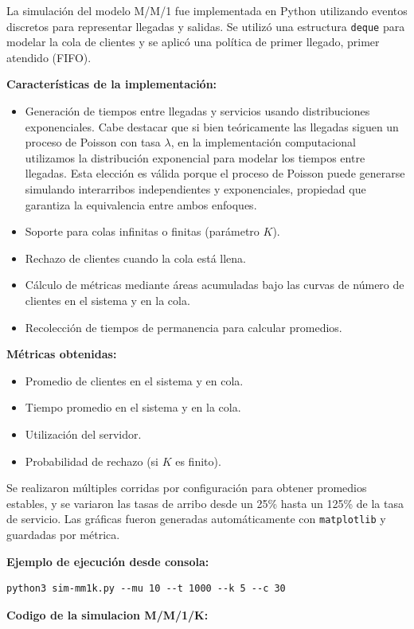 \documentclass[12pt]{article}
\begin{document}
La simulación del modelo M/M/1 fue implementada en Python utilizando eventos discretos para representar llegadas y salidas. Se utilizó una estructura \texttt{deque} para modelar la cola de clientes y se aplicó una política de primer llegado, primer atendido (FIFO).

\textbf{Características de la implementación:}
\begin{itemize}
    \item Generación de tiempos entre llegadas y servicios usando distribuciones exponenciales. Cabe destacar que si bien teóricamente las llegadas siguen un proceso de Poisson con tasa $\lambda$, en la implementación computacional utilizamos la distribución exponencial para modelar los tiempos entre llegadas. Esta elección es válida porque el proceso de Poisson puede generarse simulando interarribos independientes y exponenciales, propiedad que garantiza la equivalencia entre ambos enfoques.
    \item Soporte para colas infinitas o finitas (parámetro $K$).
    \item Rechazo de clientes cuando la cola está llena.
    \item Cálculo de métricas mediante áreas acumuladas bajo las curvas de número de clientes en el sistema y en la cola.
    \item Recolección de tiempos de permanencia para calcular promedios.
\end{itemize}

\textbf{Métricas obtenidas:}
\begin{itemize}
    \item Promedio de clientes en el sistema y en cola.
    \item Tiempo promedio en el sistema y en la cola.
    \item Utilización del servidor.
    \item Probabilidad de rechazo (si $K$ es finito).
\end{itemize}

Se realizaron múltiples corridas por configuración para obtener promedios estables, y se variaron las tasas de arribo desde un 25\% hasta un 125\% de la tasa de servicio. Las gráficas fueron generadas automáticamente con \texttt{matplotlib} y guardadas por métrica.

\textbf{Ejemplo de ejecución desde consola:}
\begin{verbatim}
python3 sim-mm1k.py --mu 10 --t 1000 --k 5 --c 30
\end{verbatim}
\textbf{Codigo de la simulacion M/M/1/K:}
\end{document}
